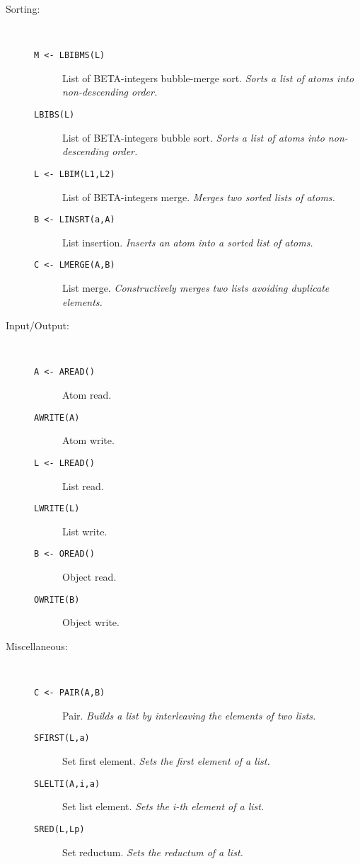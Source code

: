 \begin{description}
\item[Sorting:] \ \
  \begin{description}
  \item[{\tt M <- LBIBMS(L) 
}]  List of BETA-integers bubble-merge sort. {\em Sorts a list
    of atoms into non-descending order.}
  \item[{\tt  LBIBS(L) 
}]  List of BETA-integers bubble sort. {\em Sorts a list of
    atoms into non-descending order.}
  \item[{\tt L <- LBIM(L1,L2) 
}]  List of BETA-integers merge. {\em Merges two sorted lists of
    atoms.}
  \item[{\tt B <- LINSRT(a,A) 
}]  List insertion. {\em Inserts an atom into a sorted list of
    atoms.}
  \item[{\tt C <- LMERGE(A,B) 
}]  List merge. {\em Constructively merges two lists avoiding
  duplicate elements.}
  \end{description}

\item[Input/Output:] \ \
  \begin{description}
  \item[{\tt A <- AREAD() 
}]  Atom read.
  \item[{\tt  AWRITE(A) 
}]  Atom write.
  \item[{\tt L <- LREAD() 
}]  List read.
  \item[{\tt  LWRITE(L) 
}]  List write.
  \item[{\tt B <- OREAD() 
}]  Object read.
  \item[{\tt  OWRITE(B) 
}]  Object write.
  \end{description}

\item[Miscellaneous:] \ \
  \begin{description}
  \item[{\tt C <- PAIR(A,B) 
}]\index{PAIR}  Pair. {\em Builds a list by interleaving the elements of two
    lists.}
  \item[{\tt  SFIRST(L,a) 
}]\index{SFIRST}  Set first element. {\em Sets the first element of a list.}
  \item[{\tt  SLELTI(A,i,a) 
}]\index{SLELTI}  Set list element. {\em Sets the i-th element of a list.}
  \item[{\tt  SRED(L,Lp) 
}]\index{SRED}  Set reductum. {\em Sets the reductum of a list.}
  \end{description}
\end{description}

